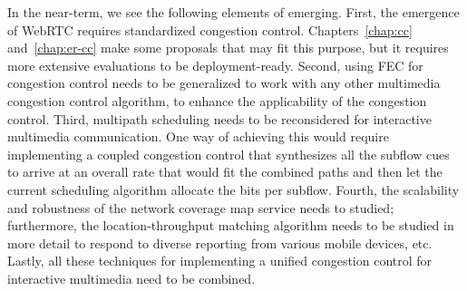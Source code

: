 
In the near-term, we see the following elements of emerging. First,
the emergence of WebRTC requires standardized congestion control.
Chapters~\ref{chap:cc} and~\ref{chap:er-cc} make some proposals that may fit
this purpose, but it requires more extensive evaluations to be deployment-ready.
Second, using FEC for congestion control needs to be generalized to work with
any other multimedia congestion control algorithm, to enhance the
applicability of the congestion control. Third, multipath scheduling needs to be reconsidered for
interactive multimedia communication. One way of achieving this would require
implementing a coupled congestion control that synthesizes all the subflow
cues to arrive at an overall rate that would fit the combined paths and then
let the current scheduling algorithm allocate the bits per subflow. Fourth,
the scalability and robustness of the network coverage map service needs to
studied; furthermore, the location-throughput matching algorithm needs to be
studied in more detail to respond to diverse reporting from
various mobile devices, etc. Lastly, all these techniques for
implementing a unified congestion control for interactive multimedia need to be combined.





